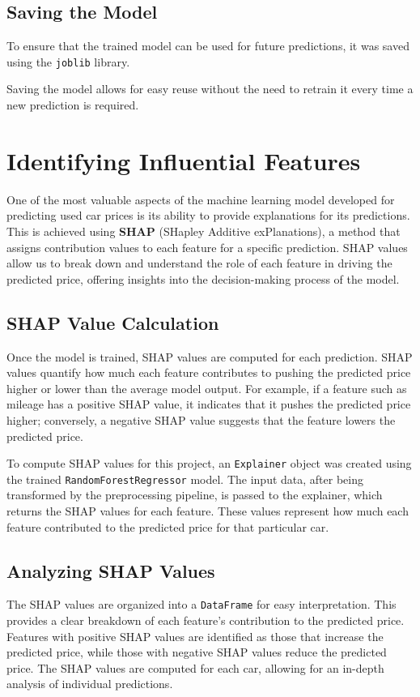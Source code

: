 \documentclass[a4paper,12pt]{article}
\begin{document}
\begin{justify}
\subsection{Saving the Model}
To ensure that the trained model can be used for future predictions, it was saved using the \texttt{joblib} library. 

Saving the model allows for easy reuse without the need to retrain it every time a new prediction is required.

\end{justify}

\section{Identifying Influential Features}
\begin{justify}
One of the most valuable aspects of the machine learning model developed for predicting used car prices is its ability to provide explanations for its predictions. This is achieved using \textbf{SHAP} (SHapley Additive exPlanations), a method that assigns contribution values to each feature for a specific prediction. SHAP values allow us to break down and understand the role of each feature in driving the predicted price, offering insights into the decision-making process of the model.

\subsection{SHAP Value Calculation}
Once the model is trained, SHAP values are computed for each prediction. SHAP values quantify how much each feature contributes to pushing the predicted price higher or lower than the average model output. For example, if a feature such as mileage has a positive SHAP value, it indicates that it pushes the predicted price higher; conversely, a negative SHAP value suggests that the feature lowers the predicted price.

To compute SHAP values for this project, an \texttt{Explainer} object was created using the trained \texttt{RandomForestRegressor} model. The input data, after being transformed by the preprocessing pipeline, is passed to the explainer, which returns the SHAP values for each feature. These values represent how much each feature contributed to the predicted price for that particular car.

\subsection{Analyzing SHAP Values}
The SHAP values are organized into a \texttt{DataFrame} for easy interpretation. This provides a clear breakdown of each feature’s contribution to the predicted price. Features with positive SHAP values are identified as those that increase the predicted price, while those with negative SHAP values reduce the predicted price. The SHAP values are computed for each car, allowing for an in-depth analysis of individual predictions.


\end{justify}
\end{document}
